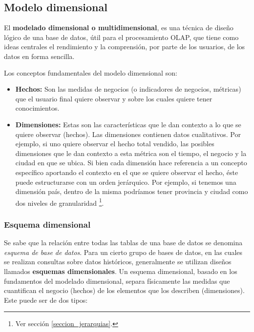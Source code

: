\documentclass[a4paper,11pt]{article}
\begin{document}
    
    \subsection{Modelo dimensional} \label{mod_dimensional}
    
    El \textbf{modelado dimensional o multidimensional}, es una técnica de diseño lógico de una base de datos, útil para el procesamiento OLAP, que tiene
    como ideas centrales el rendimiento y la comprensión, por parte de los usuarios, de los datos en forma sencilla.
    
    Los conceptos fundamentales del modelo dimensional son:
    
    \begin{itemize}
      \item \textbf{Hechos:} Son las medidas de negocios (o indicadores de negocios, métricas) que el usuario final quiere observar y sobre los cuales quiere tener
      conocimientos.
      \item \textbf{Dimensiones:} Estas son las características que le dan contexto a lo que se quiere observar (hechos).
      Las dimensiones contienen datos cualitativos. Por ejemplo, si uno quiere observar el hecho total 
      vendido, las posibles dimensiones que le dan contexto a esta métrica son el tiempo, el negocio y la ciudad en que se ubica. Si bien cada dimensión hace
      referencia a un concepto específico aportando el contexto en el que se quiere observar el hecho, éste puede estructurarse con un orden jerárquico.
      Por ejemplo, si tenemos una dimensión país, dentro de la misma podríamos tener provincia y ciudad como dos niveles de granularidad
      \footnote{Ver sección \ref{seccion_jerarquias}.}. 
    \end{itemize}
    
    \subsubsection{Esquema dimensional}
    
    Se sabe que la relación entre todas las tablas de una base de datos se denomina \textit{esquema de base de datos}. Para un cierto grupo de bases de datos, en las
    cuales se realizan consultas sobre datos históricos, generalmente se utilizan diseños llamados \textbf{esquemas dimensionales}. Un esquema dimensional,
    basado en los fundamentos del modelado dimensional, separa físicamente las medidas que cuantifican el negocio (hechos) de los elementos que los describen
    (dimensiones). Este puede ser de dos tipos:
    
\end{document}
